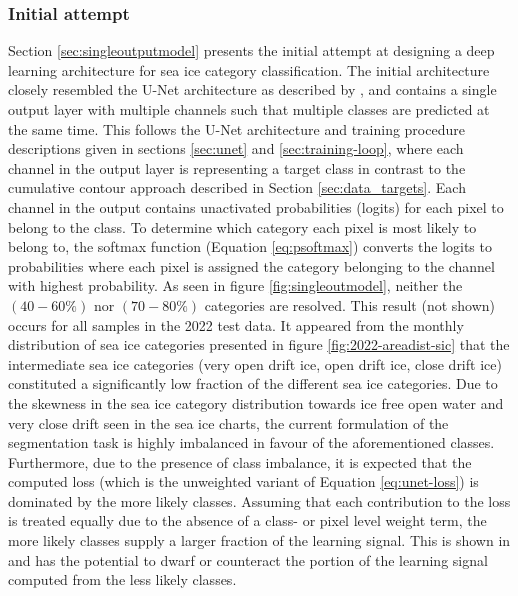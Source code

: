\documentclass[../main/thesis]{subfiles}
\begin{document}
\subsubsection{Initial attempt}
\label{sec:multiclass-intitial}
Section \ref{sec:singleoutputmodel} presents the initial attempt at designing a deep learning architecture for sea ice category classification. The initial architecture closely resembled the U-Net architecture as described by \citet{Ronneberger2015}, and contains a single output layer with multiple channels such that multiple classes are predicted at the same time. This follows the U-Net architecture and training procedure descriptions given in sections \ref{sec:unet} and \ref{sec:training-loop}, where each channel in the output layer is representing a target class in contrast to the cumulative contour approach described in Section \ref{sec:data_targets}. Each channel in the output contains unactivated probabilities (logits) for each pixel to belong to the class. To determine which category each pixel is most likely to belong to, the softmax function (Equation \ref{eq:psoftmax}) converts the logits to probabilities where each pixel is assigned the category belonging to the channel with highest probability. As seen in figure \ref{fig:singleoutmodel}, neither the $(40 - 60\%)$ nor $(70 - 80\%)$ categories are resolved. This result (not shown) occurs for all samples in the 2022 test data. It appeared from the monthly distribution of sea ice categories presented in figure \ref{fig:2022-areadist-sic} that the intermediate sea ice categories (very open drift ice, open drift ice, close drift ice) constituted a significantly low fraction of the different sea ice categories. Due to the skewness in the sea ice category distribution towards ice free open water and very close drift seen in the sea ice charts, the current formulation of the segmentation task is highly imbalanced in favour of the aforementioned classes. Furthermore, due to the presence of class imbalance, it is expected that the computed loss (which is the unweighted variant of Equation \ref{eq:unet-loss}) is dominated by the more likely classes. Assuming that each contribution to the loss is treated equally due to the absence of a class- or pixel level weight term, the more likely classes supply a larger fraction of the learning signal. This is shown in \citet{Lin2017} and has the potential to dwarf or counteract the portion of the learning signal computed from the less likely classes.
\end{document}
